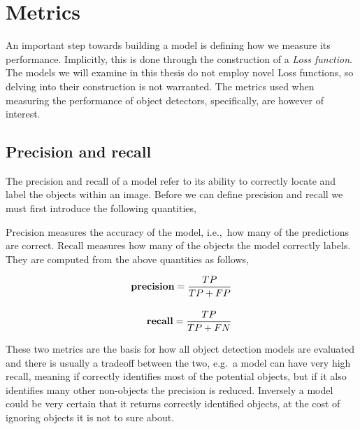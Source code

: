 \section{Metrics}
An important step towards building a model is defining how we measure its performance.
Implicitly, this is done through the construction of a \textit{Loss function}.
The models we will examine in this thesis do not employ novel Loss functions, so delving into their construction is not warranted.
The metrics used when measuring the performance of object detectors, specifically, are however of interest.

\subsection{Precision and recall}
The precision and recall of a model refer to its ability to correctly locate and label the objects within an image.
Before we can define precision and recall we must first introduce the following quantities,

\begin{center}
  {\setlength{\fboxsep}{1em}
  }
\end{center}

Precision measures the accuracy of the model, i.e.,~how many of the predictions are correct.
Recall measures how many of the objects the model correctly labels.
They are computed from the above quantities as follows,

\begin{align*}
  \text{\bf precision}=\frac{TP}{TP+FP}\\[1em]
  \text{\bf recall}=\frac{TP}{TP+FN}
\end{align*}

These two metrics are the basis for how all object detection models are evaluated and there is usually a tradeoff between the two, e.g.~a model can have very high recall, meaning if correctly identifies most of the potential objects, but if it also identifies many other non-objects the precision is reduced.
Inversely a model could be very certain that it returns correctly identified objects, at the cost of ignoring objects it is not to sure about.

